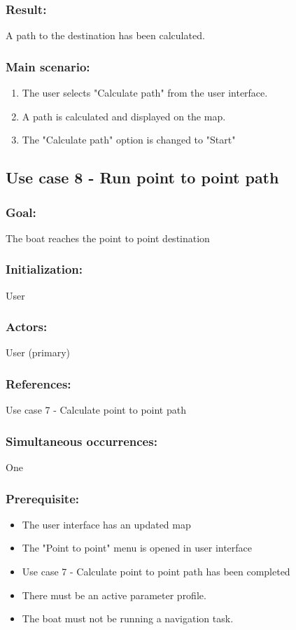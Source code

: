 \subsubsection*{Result:}
A path to the destination has been calculated.

\subsubsection*{Main scenario:}
\begin{enumerate}
	\item The user selects "Calculate path" from the user interface.
	\item A path is calculated and displayed on the map. 
	\item The "Calculate path" option is changed to "Start"
\end{enumerate}	


\subsection{Use case 8 - Run point to point path}
\subsubsection*{Goal:}
The boat reaches the point to point destination

\subsubsection*{Initialization:}
User

\subsubsection*{Actors:}
User (primary)

\subsubsection*{References:}
Use case 7 - Calculate point to point path

\subsubsection*{Simultaneous occurrences:}
One 

\subsubsection*{Prerequisite:}
\begin{itemize}
	\item The user interface has an updated map
	\item The "Point to point" menu is opened in user interface
	\item Use case 7 - Calculate point to point path has been completed
	\item There must be an active parameter profile.
	\item The boat must not be running a navigation task.
\end{itemize}

